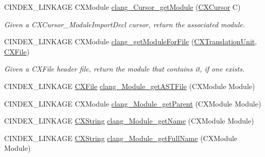 \begin{DoxyCompactItemize}
\item 
\mbox{\label{group__CINDEX__MODULE_gab69ab0bc94760b2c93d63efa8cb6a6dd}} 
C\+I\+N\+D\+E\+X\+\_\+\+L\+I\+N\+K\+A\+GE C\+X\+Module \mbox{\hyperlink{group__CINDEX__MODULE_gab69ab0bc94760b2c93d63efa8cb6a6dd}{clang\+\_\+\+Cursor\+\_\+get\+Module}} (\mbox{\hyperlink{structCXCursor}{C\+X\+Cursor}} C)
\begin{DoxyCompactList}\small\item\em Given a C\+X\+Cursor\+\_\+\+Module\+Import\+Decl cursor, return the associated module. \end{DoxyCompactList}\item 
\mbox{\label{group__CINDEX__MODULE_ga22aa52a86a00c1af80f4858c0d5f00a6}} 
C\+I\+N\+D\+E\+X\+\_\+\+L\+I\+N\+K\+A\+GE C\+X\+Module \mbox{\hyperlink{group__CINDEX__MODULE_ga22aa52a86a00c1af80f4858c0d5f00a6}{clang\+\_\+get\+Module\+For\+File}} (\mbox{\hyperlink{group__CINDEX_gacdb7815736ca709ce9a5e1ec2b7e16ac}{C\+X\+Translation\+Unit}}, \mbox{\hyperlink{group__CINDEX__FILES_gacfcea9c1239c916597e2e5b3e109215a}{C\+X\+File}})
\begin{DoxyCompactList}\small\item\em Given a C\+X\+File header file, return the module that contains it, if one exists. \end{DoxyCompactList}\item 
C\+I\+N\+D\+E\+X\+\_\+\+L\+I\+N\+K\+A\+GE \mbox{\hyperlink{group__CINDEX__FILES_gacfcea9c1239c916597e2e5b3e109215a}{C\+X\+File}} \mbox{\hyperlink{group__CINDEX__MODULE_gaa5095dd877556655d096d3165e86b0e1}{clang\+\_\+\+Module\+\_\+get\+A\+S\+T\+File}} (C\+X\+Module Module)
\item 
C\+I\+N\+D\+E\+X\+\_\+\+L\+I\+N\+K\+A\+GE C\+X\+Module \mbox{\hyperlink{group__CINDEX__MODULE_ga62e149a28d71b719b11aefee3d36df53}{clang\+\_\+\+Module\+\_\+get\+Parent}} (C\+X\+Module Module)
\item 
C\+I\+N\+D\+E\+X\+\_\+\+L\+I\+N\+K\+A\+GE \mbox{\hyperlink{structCXString}{C\+X\+String}} \mbox{\hyperlink{group__CINDEX__MODULE_ga39896de675e90c4fb2de55e109d376a8}{clang\+\_\+\+Module\+\_\+get\+Name}} (C\+X\+Module Module)
\item 
C\+I\+N\+D\+E\+X\+\_\+\+L\+I\+N\+K\+A\+GE \mbox{\hyperlink{structCXString}{C\+X\+String}} \mbox{\hyperlink{group__CINDEX__MODULE_ga09d2da739b4bbac05fa2c1ad6695095a}{clang\+\_\+\+Module\+\_\+get\+Full\+Name}} (C\+X\+Module Module)

\end{DoxyCompactItemize}
